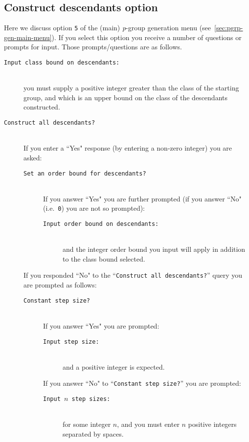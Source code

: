 \documentclass[12pt]{article}
\begin{document}
\subsection{Construct descendants option}\label{sec:constr-desc}
Here we discuss option \texttt{5} of the (main) {\it p}-group generation
menu (see~\ref{sec:pgrp-gen-main-menu}).
If you select this option you receive a number of questions or prompts
for input. Those prompts/questions are as follows.
\begin{description}
\item[\texttt{Input class bound on descendants:}]\ \\
 you must supply a positive integer greater than the class 
 of the starting group, and which is an upper bound
 on the class of the descendants constructed. 

\item[\texttt{Construct all descendants?}]\ \\
 If you enter a ``Yes" response (by entering a non-zero integer)
 you are asked:
 \begin{description}
  \item[\texttt{Set an order bound for descendants?}]\ \\
  If you answer ``Yes" you are further prompted (if you answer
  ``No" (i.e.\ \texttt{0}) you are not so prompted):
  \begin{description}
   \item[\texttt{Input order bound on descendants:}]\ \\
   and the integer order bound you input will apply in addition to 
   the class bound selected.
  \end{description}
 \end{description}
 If you responded ``No" to the ``\texttt{Construct all descendants?}'' query
 you are prompted as follows:
 \begin{description}
  \item[\texttt{Constant step size?}]\ \\
  If you answer ``Yes" you are prompted:
  \begin{description}
   \item[\texttt{Input step size:}]\ \\
   and a positive integer is expected.
  \end{description}
  If you answer ``No" to ``\texttt{Constant step size?}'' you are prompted:
  \begin{description}
   \item[\texttt{Input $n$ step sizes:}]\ \\
   for some integer $n$, and you must enter $n$ positive
   integers separated by spaces.
  \end{description}
 \end{description}


\end{description}
\end{document}
